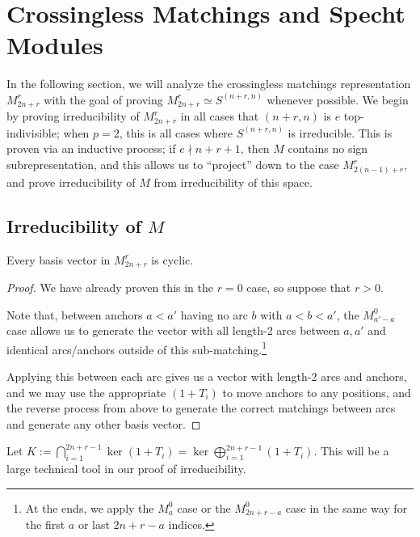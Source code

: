 \documentclass{amsart}
\begin{document}
\section{Crossingless Matchings and Specht Modules}\label{Crossingless Matchings Section}
In the following section, we will analyze the crossingless matchings representation $M_{2n + r}^r$ with the goal of proving $M_{2n + r}^r \simeq S^{(n+r,n)}$ whenever possible.
We begin by proving irreducibility of $M_{2n + r}^r$ in all cases that $(n+r,n)$ is $e$ top-indivisible;
when $p = 2$, this is all cases where $S^{(n+r,n)}$ is irreducible.
This is proven via an inductive process; if $e \nmid n + r + 1$, then $M$ contains no sign subrepresentation, and this allows us to ``project'' down to the case $M_{2(n-1) + r}^r$, and prove irreducibility of $M$ from irreducibility of this space.


\subsection{Irreducibility of $M$}
\begin{lemma}
  \label{Cyclic}
  Every basis vector in $M_{2n + r}^r$ is cyclic.
\end{lemma}
\begin{proof}
  We have already proven this in the $r = 0$ case, so suppose that $r > 0$.

    Note that, between anchors $a<a'$ having no arc $b$ with $a < b < a'$, the $M_{a'-a}^0$ case allows us to generate the vector with all length-2 arcs between $a,a'$ and identical arcs/anchors outside of this sub-matching.\footnote{At the ends, we apply the $M_a^0$ case or the $M_{2n + r - a}^{0}$ case in the same way for the first $a$ or last $2n + r - a$ indices.}

  Applying this between each arc gives us a vector with length-2 arcs and anchors, and we may use the appropriate $(1+T_i)$ to move anchors to any positions, and the reverse process from above to generate the correct matchings between arcs and generate any other basis vector.
\end{proof}

Let $K := \bigcap_{i=1}^{2n+r-1} \ker (1 + T_i) = \ker \bigoplus_{i = 1}^{2n + r - 1} (1 + T_i)$.
This will be a large technical tool in our proof of irreducibility.
\end{document}
